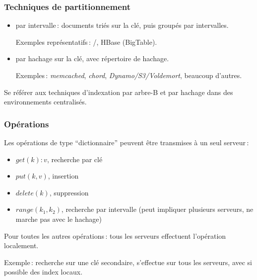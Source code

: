 \begin{frame}
\frametitle{Techniques de partitionnement}

\begin{itemize}
   \item par \alert{intervalle}\,: documents triés sur la clé, puis groupés par intervalles.
   
     Exemples représentatifs\,: \mongodb/, HBase (BigTable).
     
   \item par \alert{hachage} sur la clé, avec répertoire de hachage.
   
       Exemples\,: \textit{memcached}, \textit{chord}, \textit{Dynamo/S3/Voldemort}, beaucoup d'autres.
 \end{itemize}
 

\begin{remark}
Se référer aux techniques d'indexation par arbre-B et par hachage dans des environnements centralisés.
\end{remark}
\end{frame}

\begin{frame}
\frametitle{Opérations}

Les opérations de type ``dictionnaire'' peuvent être transmises à \alert{un seul} serveur\,:

\begin{itemize}
   \item $get(k): v$, recherche par clé
   \item $put (k, v)$, insertion
   \item $delete(k)$, suppression
   \item $range(k_1, k_2)$, recherche par intervalle (peut impliquer plusieurs serveurs, ne marche pas avec le hachage)
\end{itemize}

\vfill

\alert{Pour toutes les autres opérations}\,: tous les serveurs effectuent l'opération localement.

\vfill

Exemple\,: recherche sur une clé secondaire, s'effectue sur \alert{tous} les serveurs, avec si possible des index locaux.
\end{frame}

